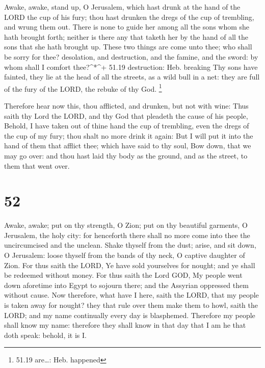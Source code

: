  Awake, awake, stand up, O Jerusalem, which hast drunk at
the hand of the LORD the cup of his fury; thou hast drunken the dregs of
the cup of trembling, and wrung them out.  There is none to
guide her among all the sons whom she hath brought forth; neither is
there any that taketh her by the hand of all the sons that she hath
brought up.  These two things are come unto thee; who shall
be sorry for thee? desolation, and destruction, and the famine, and the
sword: by whom shall I comfort thee?\^{}*\^{}+ 51.19 destruction: Heb.
breaking  Thy sons have fainted, they lie at the head of
all the streets, as a wild bull in a net: they are full of the fury of
the LORD, the rebuke of thy God. \footnote{51.19 are\ldots: Heb.
  happened}

 Therefore hear now this, thou afflicted, and drunken, but
not with wine:  Thus saith thy Lord the LORD, and thy God
that pleadeth the cause of his people, Behold, I have taken out of thine
hand the cup of trembling, even the dregs of the cup of my fury; thou
shalt no more drink it again:  But I will put it into the
hand of them that afflict thee; which have said to thy soul, Bow down,
that we may go over: and thou hast laid thy body as the ground, and as
the street, to them that went over.

\hypertarget{section-51}{%
\section{52}\label{section-51}}

 Awake, awake; put on thy strength, O Zion; put on thy
beautiful garments, O Jerusalem, the holy city: for henceforth there
shall no more come into thee the uncircumcised and the unclean.
 Shake thyself from the dust; arise, and sit down, O
Jerusalem: loose thyself from the bands of thy neck, O captive daughter
of Zion.  For thus saith the LORD, Ye have sold yourselves
for nought; and ye shall be redeemed without money.  For
thus saith the Lord GOD, My people went down aforetime into Egypt to
sojourn there; and the Assyrian oppressed them without cause.
 Now therefore, what have I here, saith the LORD, that my
people is taken away for nought? they that rule over them make them to
howl, saith the LORD; and my name continually every day is blasphemed.
 Therefore my people shall know my name: therefore they
shall know in that day that I am he that doth speak: behold, it is I.

